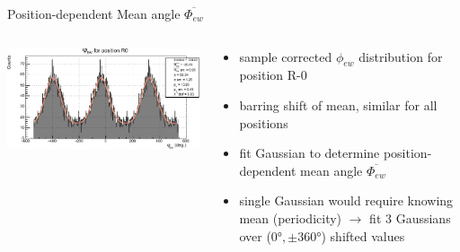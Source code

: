 \documentclass[aspectratio=169]{beamer}
\begin{document}
	
	\begin{frame}{Position-dependent Mean angle $\overline{\Phi_{ew}}$}
		\begin{columns}
			\begin{column}{.5\textwidth}
				\centering
				\includegraphics[width=1.0\textwidth]{new_alex/R0_corrected_phi_ew_all.pdf}
%				
%				
			\end{column}
			\begin{column}{.5\textwidth}
				\centering
				\begin{itemize}
					\item sample corrected $\phi_{ew}$ distribution for position R-0
					\item barring shift of mean, similar for all positions
					\item fit Gaussian to determine position-dependent mean angle
					 $\overline{\Phi_{ew}}$
					 \item single Gaussian would require knowing mean (periodicity) 
					 $\rightarrow$ fit 3 Gaussians over ($\ang{0}, \pm \ang{360}$) shifted values
				\end{itemize}
				
				
			\end{column}
		\end{columns}
	\end{frame}

\end{document}
